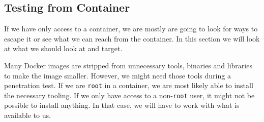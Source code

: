 \subsection{Testing from Container}
If we have only access to a container, we are mostly are going to look for ways to escape it or see what we can reach from the container. In this section we will look at what we should look at and target. 

\hfill

Many Docker images are stripped from unnecessary tools, binaries and libraries to make the image smaller. However, we might need those tools during a penetration test. If we are \lstinline{root} in a container, we are most likely able to install the necessary tooling. If we only have access to a non-\lstinline{root} user, it might not be possible to install anything. In that case, we will have to work with what is available to us.








